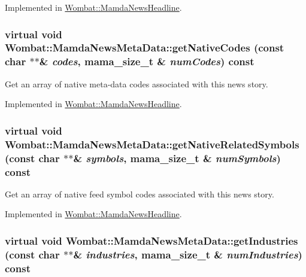 Implemented in \hyperlink{classWombat_1_1MamdaNewsHeadline_9142e41e5db9786622ffcd517b68d3b9}{Wombat::Mamda\-News\-Headline}.\hypertarget{classWombat_1_1MamdaNewsMetaData_2eee46712fbf04831baf811695678aeb}{
\subsubsection[getNativeCodes]{\setlength{\rightskip}{0pt plus 5cm}virtual void Wombat::Mamda\-News\-Meta\-Data::get\-Native\-Codes (const char $\ast$$\ast$\& {\em codes}, mama\_\-size\_\-t \& {\em num\-Codes}) const}}
\label{classWombat_1_1MamdaNewsMetaData_2eee46712fbf04831baf811695678aeb}


Get an array of native meta-data codes associated with this news story. 



Implemented in \hyperlink{classWombat_1_1MamdaNewsHeadline_49a407e757b36783514598581d4ce941}{Wombat::Mamda\-News\-Headline}.\hypertarget{classWombat_1_1MamdaNewsMetaData_64e79bec2fd98b5669ea62bb9c51fec2}{
\subsubsection[getNativeRelatedSymbols]{\setlength{\rightskip}{0pt plus 5cm}virtual void Wombat::Mamda\-News\-Meta\-Data::get\-Native\-Related\-Symbols (const char $\ast$$\ast$\& {\em symbols}, mama\_\-size\_\-t \& {\em num\-Symbols}) const}}
\label{classWombat_1_1MamdaNewsMetaData_64e79bec2fd98b5669ea62bb9c51fec2}


Get an array of native feed symbol codes associated with this news story. 



Implemented in \hyperlink{classWombat_1_1MamdaNewsHeadline_35caf4a0f9aa24db2903ae45042200c1}{Wombat::Mamda\-News\-Headline}.\hypertarget{classWombat_1_1MamdaNewsMetaData_dd73f4b456cf4c7720d3ba86e4d71a4c}{
\subsubsection[getIndustries]{\setlength{\rightskip}{0pt plus 5cm}virtual void Wombat::Mamda\-News\-Meta\-Data::get\-Industries (const char $\ast$$\ast$\& {\em industries}, mama\_\-size\_\-t \& {\em num\-Industries}) const}}
\label{classWombat_1_1MamdaNewsMetaData_dd73f4b456cf4c7720d3ba86e4d71a4c}


